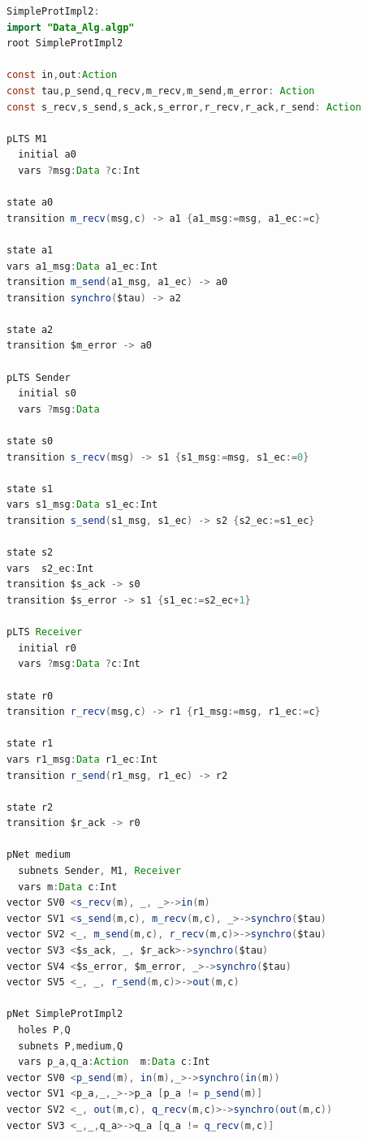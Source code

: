 \begin{lstlisting}[basicstyle=\scriptsize\ttfamily, language=java, frame=single]
SimpleProtImpl2:
import "Data_Alg.algp"
root SimpleProtImpl2

const in,out:Action
const tau,p_send,q_recv,m_recv,m_send,m_error: Action
const s_recv,s_send,s_ack,s_error,r_recv,r_ack,r_send: Action

pLTS M1
  initial a0
  vars ?msg:Data ?c:Int

state a0
transition m_recv(msg,c) -> a1 {a1_msg:=msg, a1_ec:=c}

state a1
vars a1_msg:Data a1_ec:Int
transition m_send(a1_msg, a1_ec) -> a0 
transition synchro($tau) -> a2

state a2
transition $m_error -> a0

pLTS Sender
  initial s0
  vars ?msg:Data

state s0
transition s_recv(msg) -> s1 {s1_msg:=msg, s1_ec:=0}

state s1
vars s1_msg:Data s1_ec:Int
transition s_send(s1_msg, s1_ec) -> s2 {s2_ec:=s1_ec}

state s2
vars  s2_ec:Int
transition $s_ack -> s0
transition $s_error -> s1 {s1_ec:=s2_ec+1}

pLTS Receiver
  initial r0
  vars ?msg:Data ?c:Int

state r0
transition r_recv(msg,c) -> r1 {r1_msg:=msg, r1_ec:=c}

state r1
vars r1_msg:Data r1_ec:Int
transition r_send(r1_msg, r1_ec) -> r2

state r2
transition $r_ack -> r0

pNet medium
  subnets Sender, M1, Receiver
  vars m:Data c:Int
vector SV0 <s_recv(m), _, _>->in(m)
vector SV1 <s_send(m,c), m_recv(m,c), _>->synchro($tau)
vector SV2 <_, m_send(m,c), r_recv(m,c)>->synchro($tau)
vector SV3 <$s_ack, _, $r_ack>->synchro($tau)
vector SV4 <$s_error, $m_error, _>->synchro($tau)
vector SV5 <_, _, r_send(m,c)>->out(m,c)

pNet SimpleProtImpl2
  holes P,Q
  subnets P,medium,Q
  vars p_a,q_a:Action  m:Data c:Int
vector SV0 <p_send(m), in(m),_>->synchro(in(m))
vector SV1 <p_a,_,_>->p_a [p_a != p_send(m)]
vector SV2 <_, out(m,c), q_recv(m,c)>->synchro(out(m,c))
vector SV3 <_,_,q_a>->q_a [q_a != q_recv(m,c)]
\end{lstlisting}


